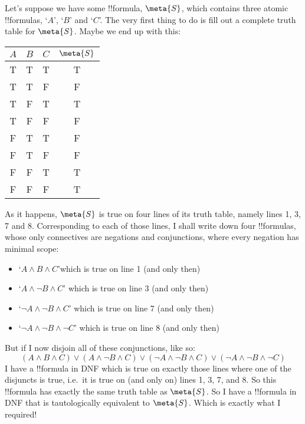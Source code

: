 \documentclass[../../../include/open-logic-section]{subfiles}
\begin{document}
Let's suppose we have some !!{formula}, $\meta{S}$, which contains three atomic !!{formula}s, `$A$', `$B$' and `$C$'. The very first thing to do is fill out a complete truth table for $\meta{S}$. Maybe we end up with this:
\begin{center}
\begin{tabular}{c c c | c}
$A$ & $B$ & $C$ & $\meta{S}$\\
\hline
 T & T & T & T \\
 T & T & F & F \\
 T & F & T & T \\
 T & F & F & F \\
 F & T & T & F \\
 F & T & F & F \\
 F & F & T & T \\
 F & F & F & T
\end{tabular}
\end{center}
%
%
As it happens, $\meta{S}$ is true on four lines of its truth table, namely lines 1, 3, 7 and 8. Corresponding to each of those lines, I shall write down four !!{formula}s, whose only connectives are negations and conjunctions, where every negation has minimal scope:
	\begin{itemize}
		\item[\textbullet]  `$A \land B \land C$'\hfill which is true on line 1 (and only then)
		\item[\textbullet] `$A \land \lnot B \land C$' \hfill which is true on line 3 (and only then)
		\item[\textbullet] `$\lnot A \land \lnot B \land C$' \hfill which is true on line 7 (and only then)
		\item[\textbullet] `$\lnot A \land \lnot B \land \lnot C$' \hfill which is true on line 8 (and only then)
	\end{itemize}
But if I now disjoin all of these conjunctions, like so:
$$(A \land B \land C) \lor (A \land \lnot B \land C) \lor (\lnot A \land \lnot B \land C) \lor (\lnot A \land \lnot B \land \lnot C)$$
I have a !!{formula} in DNF which is true on exactly those lines where one of the disjuncts is true, i.e.\ it is true on (and only on) lines 1, 3, 7, and 8. So this !!{formula} has exactly the same truth table as $\meta{S}$. So I have a !!{formula} in DNF that is tautologically equivalent to $\meta{S}$. Which is exactly what I required!
\end{document}
